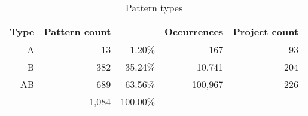 \begin{table}[H]
\caption{Pattern types}\label{table:pattern_type_counts}
\centering
\begin{tabular}{rrr|rr}
\hline
	\bfseries{Type}\rm & \bfseries{Pattern count}\rm & & \bfseries{Occurrences}\rm
	& \bfseries{Project count}\rm \\
	\hline
	A & 13 & 1.20\% & 167 & 93 \\
	B & 382 & 35.24\% & 10,741 & 204 \\
	AB & 689 & 63.56\% & 100,967 & 226 \\
	\hline
	 & 1,084 & 100.00\% &  \\
\hline
\end{tabular}
\end{table}
